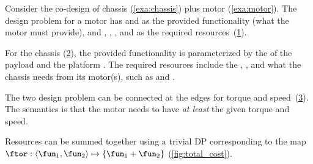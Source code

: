 \begin{example}
    \label{exa:chassis_plus_motor}Consider the co-design of chassis (\cref{exa:chassis})
    plus motor (\cref{exa:motor}). The design problem for a motor has 
    and  as the provided functionality (what the motor must
    provide), and , , , and 
    as the required resources~(\cref{fig:motor}).

    \begin{figure}[h]
        \centering
        \caption{\label{fig:motor}}
    \end{figure}


    \noindent For the chassis (\cref{fig:gmcdp_chassis}), the provided
    functionality is parameterized by the  of the payload and
    the platform . The required resources include the ,
    , and what the chassis needs from its motor(s), such
    as  and .

    \begin{figure}[h]
        \centering
        \caption{\label{fig:gmcdp_chassis}}
    \end{figure}


    \noindent The two design problem can be connected at the edges for
    torque and speed~(\cref{fig:gmcdp_chassis_plus_motor_series}). The
    semantics is that the motor needs to have\emph{ at least }the given
    torque and speed.


    \begin{figure}[h!]
        \centering
        \caption{\label{fig:gmcdp_chassis_plus_motor_series}}
    \end{figure}

    Resources can be summed together using a trivial DP corresponding
    to the map $\ftor:\left\langle \fun_{1},\fun_{2}\right\rangle \mapsto\{\fun_{1}+\fun_{2}\}$
    (\cref{fig:total_cost}).


\end{example}
